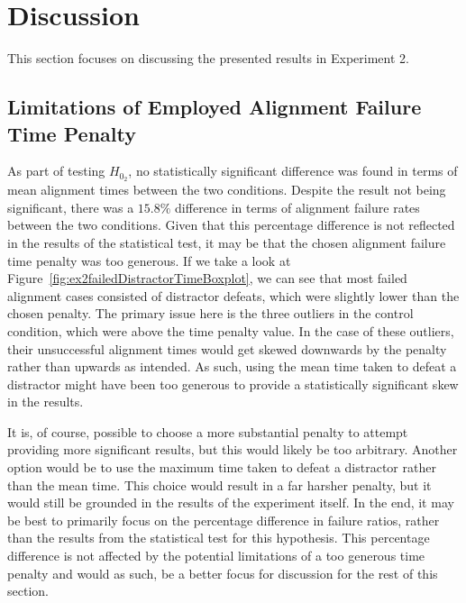 \section{Discussion}\label{sec:ex2discussion}
This section focuses on discussing the presented results in Experiment 2.

\subsection{Limitations of Employed Alignment Failure Time Penalty}\label{sec:failurePenaltyRetrospect}
As part of testing $H_{0_2}$, no statistically significant difference was found in terms of mean alignment times between the two conditions. Despite the result not being significant, there was a $15.8\%$ difference in terms of alignment failure rates between the two conditions. Given that this percentage difference is not reflected in the results of the statistical test, it may be that the chosen alignment failure time penalty was too generous. If we take a look at Figure~\ref{fig:ex2failedDistractorTimeBoxplot}, we can see that most failed alignment cases consisted of distractor defeats, which were slightly lower than the chosen penalty. The primary issue here is the three outliers in the control condition, which were above the time penalty value. In the case of these outliers, their unsuccessful alignment times would get skewed downwards by the penalty rather than upwards as intended. As such, using the mean time taken to defeat a distractor might have been too generous to provide a statistically significant skew in the results. 

It is, of course, possible to choose a more substantial penalty to attempt providing more significant results, but this would likely be too arbitrary. Another option would be to use the maximum time taken to defeat a distractor rather than the mean time. This choice would result in a far harsher penalty, but it would still be grounded in the results of the experiment itself. In the end, it may be best to primarily focus on the percentage difference in failure ratios, rather than the results from the statistical test for this hypothesis. This percentage difference is not affected by the potential limitations of a too generous time penalty and would as such, be a better focus for discussion for the rest of this section.

